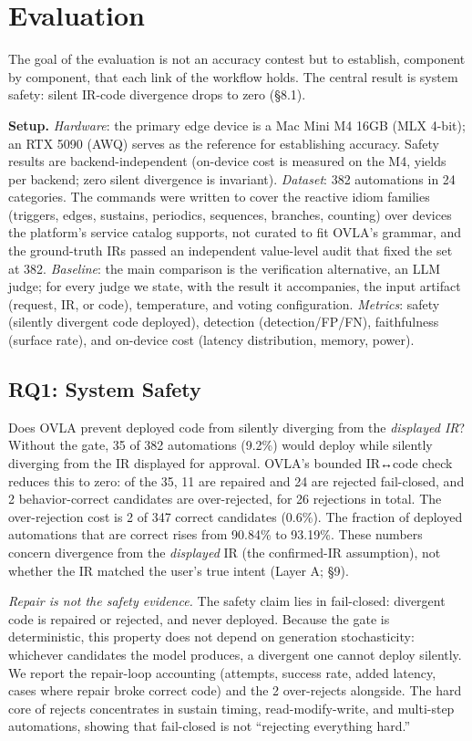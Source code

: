 \documentclass[sigconf,nonacm,anonymous,review]{acmart}
\begin{document}
\section{Evaluation}

The goal of the evaluation is not an accuracy contest but to establish, component by component, that each link of the workflow holds. The central result is system safety: silent IR-code divergence drops to zero (\S8.1).

\textbf{Setup.} \emph{Hardware}: the primary edge device is a Mac Mini M4 16GB (MLX 4-bit); an RTX 5090 (AWQ) serves as the reference for establishing accuracy. Safety results are backend-independent (on-device cost is measured on the M4, yields per backend; zero silent divergence is invariant). \emph{Dataset}: 382 automations in 24 categories. The commands were written to cover the reactive idiom families (triggers, edges, sustains, periodics, sequences, branches, counting) over devices the platform's service catalog supports, not curated to fit OVLA's grammar, and the ground-truth IRs passed an independent value-level audit that fixed the set at 382. \emph{Baseline}: the main comparison is the verification alternative, an LLM judge; for every judge we state, with the result it accompanies, the input artifact (request, IR, or code), temperature, and voting configuration. \emph{Metrics}: safety (silently divergent code deployed), detection (detection/FP/FN), faithfulness (surface rate), and on-device cost (latency distribution, memory, power).

\subsection{RQ1: System Safety}

Does OVLA prevent deployed code from silently diverging from the \emph{displayed IR}? Without the gate, 35 of 382 automations (9.2\%) would deploy while silently diverging from the IR displayed for approval. OVLA's bounded IR↔code check reduces this to zero: of the 35, 11 are repaired and 24 are rejected fail-closed, and 2 behavior-correct candidates are over-rejected, for 26 rejections in total. The over-rejection cost is 2 of 347 correct candidates (0.6\%). The fraction of deployed automations that are correct rises from 90.84\% to 93.19\%. These numbers concern divergence from the \emph{displayed} IR (the confirmed-IR assumption), not whether the IR matched the user's true intent (Layer A; \S9).

\emph{Repair is not the safety evidence.} The safety claim lies in fail-closed: divergent code is repaired or rejected, and never deployed. Because the gate is deterministic, this property does not depend on generation stochasticity: whichever candidates the model produces, a divergent one cannot deploy silently. We report the repair-loop accounting (attempts, success rate, added latency, cases where repair broke correct code) and the 2 over-rejects alongside. The hard core of rejects concentrates in sustain timing, read-modify-write, and multi-step automations, showing that fail-closed is not ``rejecting everything hard.''
\end{document}
